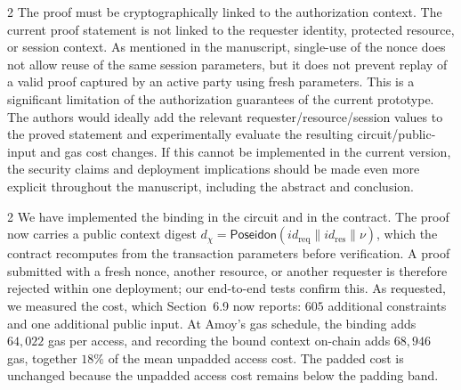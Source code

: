 \begin{reviewcomment}{2}
	The proof must be cryptographically linked to the authorization context.
	The current proof statement is not linked to the requester identity, protected resource, or session context.
	As mentioned in the manuscript, single-use of the nonce does not allow reuse of the same session parameters, but it does not prevent replay of a valid proof captured by an active party using fresh parameters.
	This is a significant limitation of the authorization guarantees of the current prototype.
	The authors would ideally add the relevant requester/resource/session values to the proved statement and experimentally evaluate the resulting circuit/public-input and gas cost changes.
	If this cannot be implemented in the current version, the security claims and deployment implications should be made even more explicit throughout the manuscript, including the abstract and conclusion.
\end{reviewcomment}

\begin{reviewresponse}{2}
	We have implemented the binding in the circuit and in the contract.
	The proof now carries a public context digest $d_{\chi}=\mathsf{Poseidon}(\mathit{id}_{\mathrm{req}}\parallel\mathit{id}_{\mathrm{res}}\parallel\nu)$, which the contract recomputes from the transaction parameters before verification.
	A proof submitted with a fresh nonce, another resource, or another requester is therefore rejected within one deployment; our end-to-end tests confirm this.
	As requested, we measured the cost, which Section~6.9 now reports: $605$ additional constraints and one additional public input.
	At Amoy's gas schedule, the binding adds $64{,}022$ gas per access, and recording the bound context on-chain adds $68{,}946$ gas, together $18\%$ of the mean unpadded access cost.
	The padded cost is unchanged because the unpadded access cost remains below the padding band.

\end{reviewresponse}
